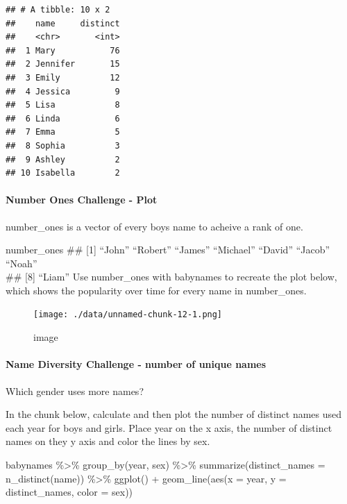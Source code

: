 \documentclass[
]{article}
\newenvironment{Shaded}{\begin{snugshade}}{\end{snugshade}}
\newcommand{\AttributeTok}[1]{\textcolor[rgb]{0.77,0.63,0.00}{#1}}
\newcommand{\FunctionTok}[1]{\textcolor[rgb]{0.00,0.00,0.00}{#1}}
\newcommand{\NormalTok}[1]{#1}
\newcommand{\SpecialCharTok}[1]{\textcolor[rgb]{0.00,0.00,0.00}{#1}}
\begin{document}
\begin{verbatim}
## # A tibble: 10 x 2
##    name     distinct
##    <chr>       <int>
##  1 Mary           76
##  2 Jennifer       15
##  3 Emily          12
##  4 Jessica         9
##  5 Lisa            8
##  6 Linda           6
##  7 Emma            5
##  8 Sophia          3
##  9 Ashley          2
## 10 Isabella        2
\end{verbatim}

\hypertarget{number-ones-challenge---plot}{%
\paragraph{Number Ones Challenge -
Plot}\label{number-ones-challenge---plot}}

number\_ones is a vector of every boys name to acheive a rank of one.

number\_ones \#\# {[}1{]} ``John'' ``Robert'' ``James'' ``Michael''
``David'' ``Jacob'' ``Noah''\\
\#\# {[}8{]} ``Liam'' Use number\_ones with babynames to recreate the
plot below, which shows the popularity over time for every name in
number\_ones.

\begin{figure}
\centering
\texttt{[image: ./data/unnamed-chunk-12-1.png]}
\caption{image}
\end{figure}

\hypertarget{name-diversity-challenge---number-of-unique-names}{%
\paragraph{Name Diversity Challenge - number of unique
names}\label{name-diversity-challenge---number-of-unique-names}}

Which gender uses more names?

In the chunk below, calculate and then plot the number of distinct names
used each year for boys and girls. Place year on the x axis, the number
of distinct names on they y axis and color the lines by sex.

\begin{Shaded}
\begin{Highlighting}[]
\NormalTok{babynames }\SpecialCharTok{\%\textgreater{}\%}
  \FunctionTok{group\_by}\NormalTok{(year, sex) }\SpecialCharTok{\%\textgreater{}\%}
  \FunctionTok{summarize}\NormalTok{(}\AttributeTok{distinct\_names =} \FunctionTok{n\_distinct}\NormalTok{(name)) }\SpecialCharTok{\%\textgreater{}\%}
  \FunctionTok{ggplot}\NormalTok{() }\SpecialCharTok{+}
    \FunctionTok{geom\_line}\NormalTok{(}\FunctionTok{aes}\NormalTok{(}\AttributeTok{x =}\NormalTok{ year, }\AttributeTok{y =}\NormalTok{ distinct\_names, }\AttributeTok{color =}\NormalTok{ sex))}
\end{Highlighting}
\end{Shaded}
\end{document}
